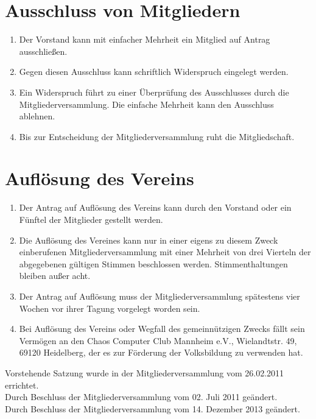 \documentclass[a4paper, 12pt]{scrartcl}
\begin{document}
\section{Ausschluss von Mitgliedern}
\begin{enumerate}
	\item Der Vorstand kann mit einfacher Mehrheit ein Mitglied auf Antrag ausschließen.
	\item Gegen diesen Ausschluss kann schriftlich Widerspruch eingelegt werden.
	\item Ein Widerspruch führt zu einer Überprüfung des Ausschlusses durch die Mitgliederversammlung. Die einfache Mehrheit kann den Ausschluss ablehnen.
	\item Bis zur Entscheidung der Mitgliederversammlung ruht die Mitgliedschaft.
\end{enumerate}

\section{Auflösung des Vereins}
\begin{enumerate}
	\item Der Antrag auf Auflösung des Vereins kann durch den Vorstand oder ein Fünftel der Mitglieder gestellt werden.
	\item Die Auflösung des Vereines kann nur in einer eigens zu diesem Zweck einberufenen Mitgliederversammlung mit einer Mehrheit von drei Vierteln der abgegebenen gültigen Stimmen beschlossen werden. Stimmenthaltungen bleiben außer acht.
	\item Der Antrag auf Auflösung muss der Mitgliederversammlung spätestens vier
Wochen vor ihrer Tagung vorgelegt worden sein.
	\item Bei Auflösung des Vereins oder Wegfall des gemeinnützigen Zwecks fällt sein Vermögen an den Chaos Computer Club Mannheim e.V., Wielandtstr. 49, 69120 Heidelberg,
	der es zur Förderung der Volksbildung zu verwenden hat.
\end{enumerate}

\vspace{2.5cm}

\noindent Vorstehende Satzung wurde in der Mitgliederversammlung vom 26.02.2011 errichtet. \\[0.5em]
Durch Beschluss der Mitgliederversammlung vom 02. Juli 2011 geändert.\\[0.5cm]
Durch Beschluss der Mitgliederversammlung vom 14. Dezember 2013 geändert.\\[0.5cm]

\newpage
\mbox{}
\end{document}
